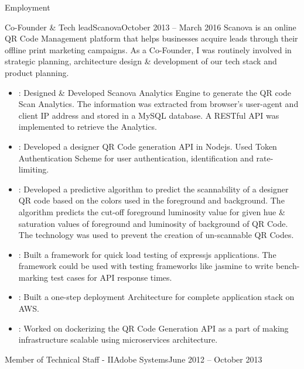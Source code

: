 \documentclass[]{mukeshcv}
\begin{document}
	\begin{cvsection}{Employment}
		\begin{cvsubsection}{Co-Founder \& Tech lead}{Scanova}{October 2013 -- March 2016}
		Scanova is an online QR Code Management platform that helps businesses acquire leads through their offline print marketing campaigns. As a Co-Founder, I was routinely involved in strategic planning, architecture design \& development of our tech stack and product planning.  \\

			\begin{itemize}
				\item {}: Designed \& Developed Scanova Analytics Engine to generate the QR code Scan Analytics. The information was extracted from browser's user-agent and client IP address and stored in a MySQL database. A RESTful API was implemented to retrieve the Analytics.
				\item {}: Developed a  designer QR Code generation API in Nodejs. Used Token Authentication Scheme for user authentication, identification and rate-limiting.
				\item {}: Developed a predictive algorithm to predict the scannability of a designer QR code based on the colors used in the foreground and background. The algorithm predicts the cut-off foreground luminosity value for given hue \& saturation values of foreground and luminosity of background of QR Code. The technology was used to prevent the creation of un-scannable QR Codes.
				\item {}: Built a framework for quick load testing of expressjs applications. The framework could be used with testing frameworks like jasmine to write bench-marking test cases for API response times.
				\item {}: Built a one-step deployment Architecture for complete application stack on AWS.
				\item {}: Worked on dockerizing the QR Code Generation API as a part of making infrastructure scalable using microservices architecture.
			\end{itemize}
		\end{cvsubsection}
		\begin{cvsubsection}{Member of Technical Staff - II}{Adobe Systems}{June 2012 -- October 2013}	

\end{cvsubsection}
\end{cvsection}
\end{document}
